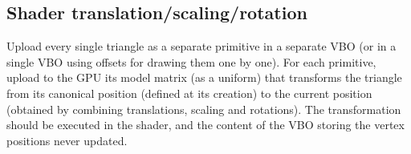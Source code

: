 \documentclass[11pt]{article}
\begin{document}
\subsection{Shader translation/scaling/rotation}
\label{sec:shader}
Upload every single triangle as a separate primitive in a separate VBO (or in a single VBO using offsets for drawing them one by one). For each primitive, upload to the GPU its model matrix (as a uniform) that transforms the triangle from its canonical position (defined at its creation) to the current position (obtained by combining translations, scaling and rotations). The transformation should be executed in the shader, and the content of the VBO storing the vertex positions never updated.

%
%
\end{document}
